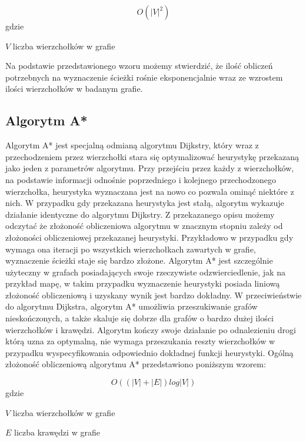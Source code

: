 \begin{equation}
O(|V|^2)
\end{equation}
gdzie
\begin{eqwhere}[2cm]
	\item[$V$] liczba wierzchołków w grafie 
\end{eqwhere}

Na podstawie przedstawionego wzoru możemy stwierdzić, że ilość obliczeń potrzebnych na wyznaczenie ścieżki rośnie eksponencjalnie wraz ze wzrostem ilości wierzchołków w badanym grafie.

\subsection{Algorytm A*}

Algorytm A* jest specjalną odmianą algorytmu Dijkstry, który wraz z przechodzeniem przez wierzchołki stara się optymalizować heurystykę przekazaną jako jeden z parametrów algorytmu. Przy przejściu przez każdy z wierzchołków, na podstawie informacji odnośnie poprzedniego i kolejnego przechodzonego wierzchołka, heurystyka wyznaczana jest na nowo co pozwala ominąć niektóre z nich. W przypadku gdy przekazana heurystyka jest stałą, algorytm wykazuje działanie identyczne do algorytmu Dijkstry. Z przekazanego opisu możemy odczytać że złożoność obliczeniowa algorytmu w znacznym stopniu zależy od złożoności obliczeniowej przekazanej heurystyki. Przykładowo w przypadku gdy wymaga ona iteracji po wszystkich wierzchołkach zawartych w grafie, wyznaczenie ścieżki staje się bardzo złożone. Algorytm A* jest szczególnie użyteczny w grafach posiadających swoje rzeczywiste odzwierciedlenie, jak na przykład mapę, w takim przypadku wyznaczenie heurystyki posiada liniową złożoność obliczeniową i uzyskany wynik jest bardzo dokładny.
W przeciwieństwie do algorytmu Dijkstra, algorytm A* umożliwia przeszukiwanie grafów nieskończonych, a także skaluje się dobrze dla grafów o bardzo dużej ilości wierzchołków i krawędzi. Algorytm kończy swoje działanie po odnalezieniu drogi którą uzna za optymalną, nie wymaga przeszukania reszty wierzchołków w przypadku wyspecyfikowania odpowiednio dokładnej funkcji heurystyki. Ogólną złożoność obliczeniową algorytmu A* przedstawiono poniższym wzorem:\newline

\begin{equation}
O((|V| + |E|) log |V|)
\end{equation}
gdzie
\begin{eqwhere}[2cm]
	\item[$V$] liczba wierzchołków w grafie 
	\item[$E$] liczba krawędzi w grafie 
\end{eqwhere}

